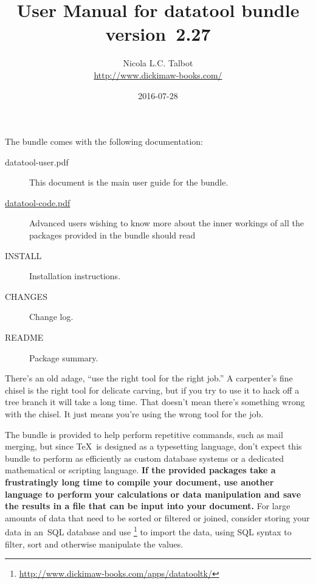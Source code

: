 \documentclass[report,widecs]{nlctdoc}
\begin{document}
\raggedright
\setlength{\parindent}{1em}%


 \title{User Manual for datatool bundle version~2.27}
 \author{Nicola L.C. Talbot\\
\url{http://www.dickimaw-books.com/}}

 \date{2016-07-28}
 \maketitle


\noindent
The  bundle comes with the following documentation:
\begin{description}
  \item[datatool-user.pdf]
  This document is the main user guide for the 
  bundle.

  \item[\url{datatool-code.pdf}]
  Advanced users wishing to know more about the inner workings of
  all the packages provided in the  bundle should
  read 

  \item[INSTALL] Installation instructions.

  \item[CHANGES] Change log.

  \item[README] Package summary.
\end{description}

\begin{important}
There's an old adage, ``use the right tool for the right job.''
A carpenter's fine chisel is the right tool for delicate carving,
but if you try to use it to hack off a tree branch it will take a
long time. That doesn't mean there's something wrong with the
chisel. It just means you're using the wrong tool for the job.

The  bundle is provided to help perform repetitive
commands, such as mail merging, but since \TeX\ is designed as a
typesetting language, don't expect this bundle to perform as
efficiently as custom database systems or a dedicated mathematical
or scripting language. \textbf{If the provided packages take a frustratingly
long time to compile your document, use another language to perform
your calculations or data manipulation and save the results in a
file that can be input into your document.} For large amounts of
data that need to be sorted or filtered or joined, consider storing your data 
in an~SQL database and use
\footnote{\url{http://www.dickimaw-books.com/apps/datatooltk/}} to import the data, 
using SQL syntax to filter, sort and otherwise
manipulate the values.
\end{important}
\end{document}
